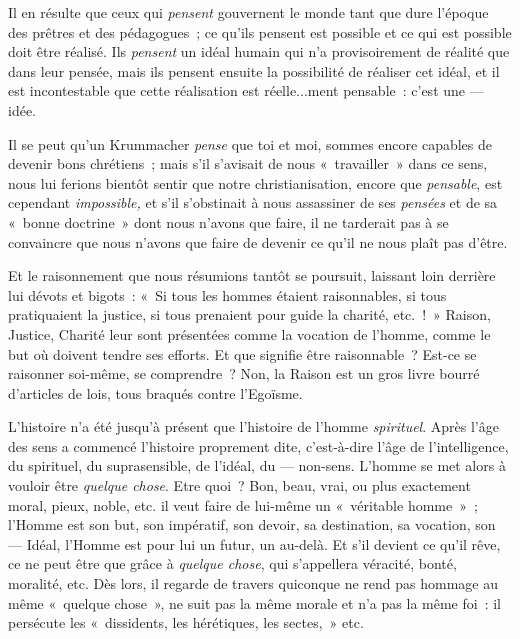 \documentclass[french,twoside]{book} %
\begin{document}
Il en résulte que ceux qui \emph{pensent} gouvernent le monde tant que dure l’époque des prêtres et des pédagogues ; ce qu’ils pensent est possible et ce qui est possible doit être réalisé. Ils \emph{pensent} un idéal humain qui n’a provisoirement de réalité que dans leur pensée, mais ils pensent ensuite la possibilité de réaliser cet idéal, et il est incontestable que cette réalisation est réelle...ment pensable : c’est une — idée.\par
Il se peut qu’un Krummacher \emph{pense} que toi et moi, sommes encore capables de devenir bons chrétiens ; mais s’il s’avisait de nous « travailler » dans ce sens, nous lui ferions bientôt sentir que notre christianisation, encore que \emph{pensable}, est cependant \emph{impossible,} et s’il s’obstinait à nous assassiner de ses \emph{pensées} et de sa « bonne doctrine » dont nous n’avons que faire, il ne tarderait pas à se convaincre que nous n’avons que faire de devenir ce qu’il ne nous plaît pas d’être.\par
Et le raisonnement que nous résumions tantôt se poursuit, laissant loin derrière lui dévots et bigots : « Si tous les hommes étaient raisonnables, si tous pratiquaient la justice, si tous prenaient pour guide la charité, etc. ! » Raison, Justice, Charité leur sont présentées comme la vocation de l’homme, comme le but où doivent tendre ses efforts. Et que signifie être raisonnable ? Est-ce se raisonner soi-même, se comprendre ? Non, la Raison est un gros livre bourré d’articles de lois, tous braqués contre l’Egoïsme.\par
L’histoire n’a été jusqu’à présent que l’histoire de l’homme \emph{spirituel}. Après l’âge des sens a commencé  l’histoire proprement dite, c’est-à-dire l’âge de l’intelligence, du spirituel, du suprasensible, de l’idéal, du — non-sens. L’homme se met alors à vouloir être \emph{quelque chose}. Etre quoi ? Bon, beau, vrai, ou plus exactement moral, pieux, noble, etc. il veut faire de lui-même un « véritable homme » ; l’Homme est son but, son impératif, son devoir, sa destination, sa vocation, son — Idéal, l’Homme est pour lui un futur, un au-delà. Et s’il devient ce qu’il rêve, ce ne peut être que grâce à \emph{quelque chose}, qui s’appellera véracité, bonté, moralité, etc. Dès lors, il regarde de travers quiconque ne rend pas hommage au même « quelque chose », ne suit pas la même morale et n’a pas la même foi : il persécute les « dissidents, les hérétiques, les sectes, » etc.\par
\end{document}
